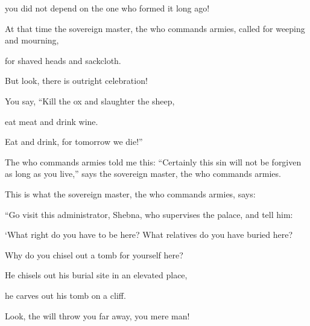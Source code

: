 {\par }{\Q you did not
depend
on
the one who formed
it long ago!
\par }{\Q {}At that time
the sovereign
master, the
{}
who commands armies,
called
for weeping
and mourning,
\par }{\Q for shaved
heads and sackcloth.
\par }{\Q {}But look,
there is outright celebration!

\par }{\Q You say, “Kill
the ox
and slaughter
the sheep,
\par }{\Q eat
meat
and drink
wine.
\par }{\Q Eat
and drink,
for
tomorrow
we die!”
\par }{\PP {}The
{}
who commands armies
told me this: “Certainly
this
sin
will not
be forgiven
as long
as you live,”
says
the sovereign
master, the
{}
who commands armies.
\par }{\Q {}This is what
the sovereign
master, the
{}
who commands armies,
says:
\par }{\Q “Go
visit
this
administrator,
Shebna,
who
supervises
the palace, and tell him:
\par }{\Q {}‘What
right do you have to be here? What
relatives do you have buried here?

\par }{\Q Why
do you chisel out
a tomb for yourself here?
\par }{\Q He chisels
out his burial site
in an elevated
place,
\par }{\Q he carves
out his tomb
on a cliff.
\par }{\Q {}Look,
the {}
will throw
you far away,
you mere man!

}
